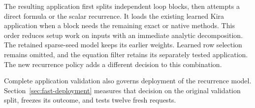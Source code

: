 The resulting application first splits independent loop blocks, then attempts a direct formula or the scalar recurrence. It loads the existing learned Kira application when a block needs the remaining exact or native methods. This order reduces setup work on inputs with an immediate analytic decomposition. The retained sparse-seed model keeps its earlier weights. Learned row selection remains omitted, and the equation filter retains its separately tested application. The new recurrence policy adds a different decision to this combination.

Complete application validation also governs deployment of the recurrence model. Section~\ref{sec:fast-deployment} measures that decision on the original validation split, freezes its outcome, and tests twelve fresh requests.
